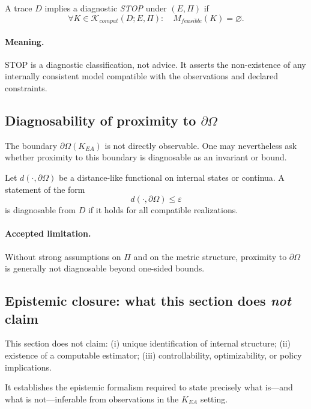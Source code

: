 \begin{definition}
\label{def:feasibility_collapse_stop}
A trace $D$ implies a diagnostic \emph{STOP} under $(E,\Pi)$ if
\[
\forall K \in \mathcal{K}_{compat}(D;E,\Pi):\quad M_{feasible}(K) = \varnothing.
\]
\end{definition}

\paragraph{Meaning.}
STOP is a diagnostic classification, not advice.
It asserts the non-existence of any internally consistent model compatible with
the observations and declared constraints.

\subsection{Diagnosability of proximity to \texorpdfstring{$\partial\Omega$}{dOmega}}
The boundary $\partial\Omega(K_{EA})$ is not directly observable.
One may nevertheless ask whether proximity to this boundary is diagnosable as an
invariant or bound.

\begin{definition}
\label{def:diagnosable_proximity}
Let $d(\cdot,\partial\Omega)$ be a distance-like functional on internal states or
continua.
A statement of the form
\[
d(\cdot,\partial\Omega) \le \varepsilon
\]
is diagnosable from $D$ if it holds for all compatible realizations.
\end{definition}

\paragraph{Accepted limitation.}
Without strong assumptions on $\Pi$ and on the metric structure, proximity to
$\partial\Omega$ is generally not diagnosable beyond one-sided bounds.

\subsection{Epistemic closure: what this section does \emph{not} claim}
This section does not claim:
(i) unique identification of internal structure;
(ii) existence of a computable estimator;
(iii) controllability, optimizability, or policy implications.

It establishes the epistemic formalism required to state precisely what is—and
what is not—inferable from observations in the $K_{EA}$ setting.
